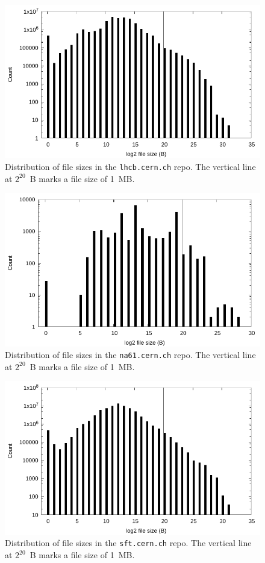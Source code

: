 \documentclass[sigconf]{acmart}
\begin{document}
\begin{figure}
\includegraphics[width=\linewidth]{plots/file-hist/lhcb.pdf}
\caption{Distribution of file sizes in the \texttt{lhcb.cern.ch} repo.
The vertical line at $2^{20}$~B marks a file size of 1~MB.}
\end{figure}

\begin{figure}
\includegraphics[width=\linewidth]{plots/file-hist/na61.pdf}
\caption{Distribution of file sizes in the \texttt{na61.cern.ch} repo.
The vertical line at $2^{20}$~B marks a file size of 1~MB.}
\end{figure}

\begin{figure}
\includegraphics[width=\linewidth]{plots/file-hist/sft.pdf}
\caption{Distribution of file sizes in the \texttt{sft.cern.ch} repo.
The vertical line at $2^{20}$~B marks a file size of 1~MB.}
\end{figure}
\end{document}
